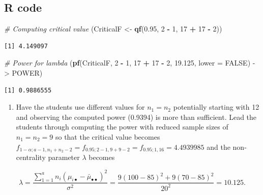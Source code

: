 \documentclass[
]{article}
\newenvironment{Shaded}{\begin{snugshade}}{\end{snugshade}}
\newcommand{\AttributeTok}[1]{\textcolor[rgb]{0.13,0.29,0.53}{#1}}
\newcommand{\CommentTok}[1]{\textcolor[rgb]{0.56,0.35,0.01}{\textit{#1}}}
\newcommand{\ConstantTok}[1]{\textcolor[rgb]{0.56,0.35,0.01}{#1}}
\newcommand{\DecValTok}[1]{\textcolor[rgb]{0.00,0.00,0.81}{#1}}
\newcommand{\FloatTok}[1]{\textcolor[rgb]{0.00,0.00,0.81}{#1}}
\newcommand{\FunctionTok}[1]{\textcolor[rgb]{0.13,0.29,0.53}{\textbf{#1}}}
\newcommand{\NormalTok}[1]{#1}
\newcommand{\OtherTok}[1]{\textcolor[rgb]{0.56,0.35,0.01}{#1}}
\newcommand{\SpecialCharTok}[1]{\textcolor[rgb]{0.81,0.36,0.00}{\textbf{#1}}}
\providecommand{\tightlist}{%
  \setlength{\itemsep}{0pt}\setlength{\parskip}{0pt}}
\begin{document}
\hypertarget{r-code}{%
\subsection*{R code}\label{r-code}}

\begin{Shaded}
\begin{Highlighting}[]
\CommentTok{\# Computing critical value}
\NormalTok{(CriticalF }\OtherTok{\textless{}{-}} \FunctionTok{qf}\NormalTok{(}\FloatTok{0.95}\NormalTok{, }\DecValTok{2} \SpecialCharTok{{-}} \DecValTok{1}\NormalTok{, }\DecValTok{17} \SpecialCharTok{+} \DecValTok{17} \SpecialCharTok{{-}} \DecValTok{2}\NormalTok{))}
\end{Highlighting}
\end{Shaded}

\begin{verbatim}
[1] 4.149097
\end{verbatim}

\begin{Shaded}
\begin{Highlighting}[]
\CommentTok{\# Power for lambda}
\NormalTok{(}\FunctionTok{pf}\NormalTok{(CriticalF, }\DecValTok{2} \SpecialCharTok{{-}} \DecValTok{1}\NormalTok{, }\DecValTok{17} \SpecialCharTok{+} \DecValTok{17} \SpecialCharTok{{-}} \DecValTok{2}\NormalTok{, }\FloatTok{19.125}\NormalTok{, }\AttributeTok{lower =} \ConstantTok{FALSE}\NormalTok{) }\OtherTok{{-}\textgreater{}}\NormalTok{ POWER)}
\end{Highlighting}
\end{Shaded}

\begin{verbatim}
[1] 0.9886555
\end{verbatim}

\begin{enumerate}
\def\labelenumi{\alph{enumi})}
\setcounter{enumi}{3}
\tightlist
\item
  Have the students use different values for \(n_1 = n_2\) potentially starting with 12 and observing the computed power (0.9394) is more than sufficient. Lead the students through computing the power with reduced sample sizes of \(n_1 = n_2 = 9\) so that the critical value becomes \(f_{1 - \alpha; a - 1, n_1 + n_2 -2} = f_{0.95; 2 - 1, 9 + 9 -2} = f_{0.95; 1, 16} = 4.4939985\) and the non-centrality parameter \(\lambda\) becomes
\end{enumerate}

\begin{equation*}
\lambda = \frac{\sum_{1 = 1}^an_i(\mu_{i\bullet} - \bar{\mu}_{\bullet\bullet})^2}{\sigma^2} = \frac{9(100 - 85)^2 + 9(70 - 85)^2}{20^2} = 10.125.
\end{equation*}
\end{document}
